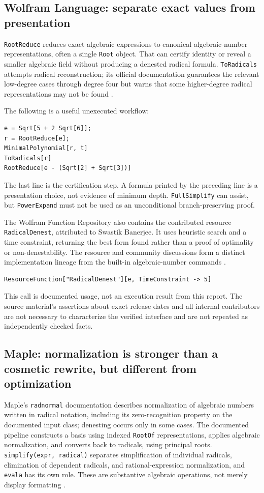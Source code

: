 \documentclass[11pt,oneside]{article}
\numberwithin{equation}{section}
\theoremstyle{definition}
\theoremstyle{remark}
\begin{document}
\subsection{Wolfram Language: separate exact values from presentation}
\texttt{RootReduce} reduces exact algebraic expressions to canonical algebraic-number representations, often a single \texttt{Root} object. That can certify identity or reveal a smaller algebraic field without producing a denested radical formula. \texttt{ToRadicals} attempts radical reconstruction; its official documentation guarantees the relevant low-degree cases through degree four but warns that some higher-degree radical representations may not be found \cite{wolframroot,wolframradicals}.

The following is a useful unexecuted workflow:
\begin{lstlisting}
e = Sqrt[5 + 2 Sqrt[6]];
r = RootReduce[e];
MinimalPolynomial[r, t]
ToRadicals[r]
RootReduce[e - (Sqrt[2] + Sqrt[3])]
\end{lstlisting}
The last line is the certification step. A formula printed by the preceding line is a presentation choice, not evidence of minimum depth. \texttt{FullSimplify} can assist, but \texttt{PowerExpand} must not be used as an unconditional branch-preserving proof.

The Wolfram Function Repository also contains the contributed resource \texttt{RadicalDenest}, attributed to Swastik Banerjee. It uses heuristic search and a time constraint, returning the best form found rather than a proof of optimality or non-denestability. The resource and community discussions form a distinct implementation lineage from the built-in algebraic-number commands \cite{wolframresource,wolframcommunity}.
\begin{lstlisting}
ResourceFunction["RadicalDenest"][e, TimeConstraint -> 5]
\end{lstlisting}
This call is documented usage, not an execution result from this report. The source material's assertions about exact release dates and all internal contributors are not necessary to characterize the verified interface and are not repeated as independently checked facts.

\subsection{Maple: normalization is stronger than a cosmetic rewrite, but different from optimization}
Maple's \texttt{radnormal} documentation describes normalization of algebraic numbers written in radical notation, including its zero-recognition property on the documented input class; denesting occurs only in some cases. The documented pipeline constructs a basis using indexed \texttt{RootOf} representations, applies algebraic normalization, and converts back to radicals, using principal roots. \texttt{simplify(expr, radical)} separates simplification of individual radicals, elimination of dependent radicals, and rational-expression normalization, and \texttt{evala} has its own role. These are substantive algebraic operations, not merely display formatting \cite{maple}.
\end{document}
